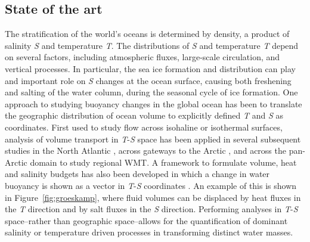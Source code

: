 \documentclass[a4paper,12pt]{article}
\begin{document}
    
    \subsection{State of the art}
    The stratification of the world's oceans is determined by density, a product of salinity \emph{S} and temperature \emph{T}. The distributions of \emph{S} and temperature \emph{T} depend on several factors, including atmospheric fluxes, large-scale circulation, and vertical processes. In particular, the sea ice formation and distribution can play and important role on \emph{S} changes at the ocean surface, causing both freshening and salting of the water column, during the seasonal cycle of ice formation. One approach to studying buoyancy changes in the global ocean has been to translate the geographic distribution of ocean volume to explicitly defined \emph{T} and \emph{S} as coordinates. First used to study flow across isohaline \cite{Walin_1977} or isothermal \cite{Walin1982} surfaces, analysis of volume transport in \emph{T}-\emph{S} space has been applied in several subsequent studies in the North Atlantic \cite{Speer1993}, across gateways to the Arctic \cite{Rudels2008}, and across the pan-Arctic domain \cite{Pemberton2015} to study regional WMT. A framework to formulate volume, heat and salinity budgets has also been developed in which a change in water buoyancy is shown as a vector in \emph{T}-\emph{S} coordinates \cite{Speer1993,Hieronymus2014}. An example of this is shown in Figure~\ref{fig:groeskamp}, where fluid volumes can be displaced by heat fluxes in the \emph{T} direction and by salt fluxes in the \emph{S} direction. Performing analyses in \emph{T}-\emph{S} space–rather than geographic space–allows for the quantification of dominant salinity or temperature driven processes in transforming distinct water masses.
\end{document}
